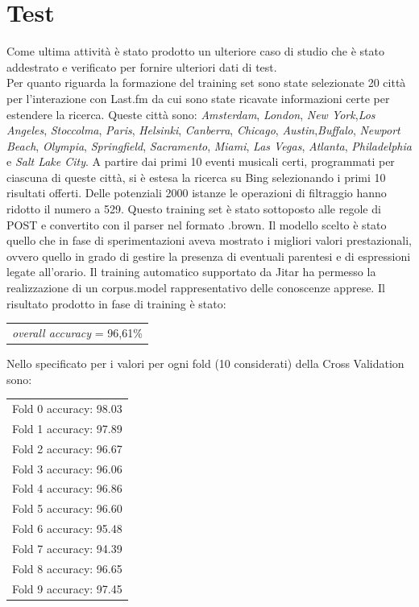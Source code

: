 \documentclass[a4paper]{report}
\begin{document}
\section{Test}
Come ultima attività è stato prodotto un ulteriore caso di studio che è stato addestrato e verificato per fornire ulteriori dati di test. \\
Per quanto riguarda la formazione del training set sono state selezionate 20 città per l'interazione con Last.fm da cui sono state ricavate informazioni certe per estendere la ricerca. Queste città sono:  \textit{Amsterdam}, \textit{London}, \textit{New York},\textit{Los Angeles}, \textit{Stoccolma}, \textit{Paris}, \textit{Helsinki}, \textit{Canberra}, \textit{Chicago}, \textit{Austin},\textit{Buffalo}, \textit{Newport Beach}, \textit{Olympia}, \textit{Springfield}, \textit{Sacramento}, \textit{Miami}, \textit{Las Vegas}, \textit{Atlanta}, \textit{Philadelphia} e \textit{Salt Lake City}. A partire dai primi 10 eventi musicali certi, programmati per ciascuna di queste città, si è estesa la ricerca su Bing selezionando i primi 10 risultati offerti. Delle potenziali 2000 istanze le operazioni di filtraggio hanno ridotto il numero a 529. Questo training set è stato sottoposto alle regole di POST e convertito con il parser nel formato .brown. Il modello scelto è stato quello che in fase di sperimentazioni aveva mostrato i migliori valori prestazionali, ovvero quello in grado di gestire la presenza di eventuali parentesi e di espressioni legate all'orario. Il training automatico supportato da Jitar ha permesso la realizzazione di un corpus.model rappresentativo delle conoscenze apprese.  Il risultato prodotto in fase di training è stato:
\begin{center}
\begin{tabular}{c}
\textit{overall accuracy} = 96,61\%\\
\end{tabular}
\end{center}
Nello specificato per i valori per ogni fold (10 considerati) della Cross Validation sono:
\begin{center}
\begin{tabular}{c}
Fold 0 accuracy: 98.03 \\ 
Fold 1 accuracy: 97.89 \\ 
Fold 2 accuracy: 96.67 \\ 
Fold 3 accuracy: 96.06 \\ 
Fold 4 accuracy: 96.86 \\ 
Fold 5 accuracy: 96.60 \\
Fold 6 accuracy: 95.48 \\
Fold 7 accuracy: 94.39 \\
Fold 8 accuracy: 96.65 \\
Fold 9 accuracy: 97.45 \\
\end{tabular}
\end{center}
\end{document}
